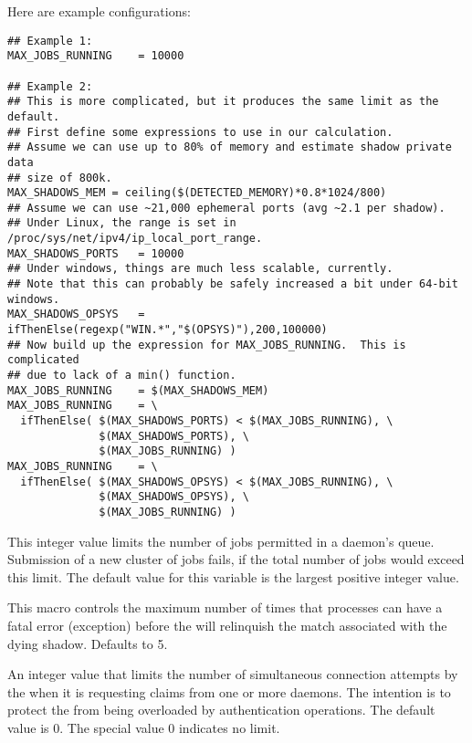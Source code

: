 \begin{description}
  Here are example configurations:

\footnotesize
\begin{verbatim}
## Example 1:
MAX_JOBS_RUNNING	= 10000

## Example 2:
## This is more complicated, but it produces the same limit as the default.
## First define some expressions to use in our calculation.
## Assume we can use up to 80% of memory and estimate shadow private data
## size of 800k.
MAX_SHADOWS_MEM	= ceiling($(DETECTED_MEMORY)*0.8*1024/800)
## Assume we can use ~21,000 ephemeral ports (avg ~2.1 per shadow).
## Under Linux, the range is set in /proc/sys/net/ipv4/ip_local_port_range.
MAX_SHADOWS_PORTS	= 10000
## Under windows, things are much less scalable, currently.
## Note that this can probably be safely increased a bit under 64-bit windows.
MAX_SHADOWS_OPSYS	= ifThenElse(regexp("WIN.*","$(OPSYS)"),200,100000)
## Now build up the expression for MAX_JOBS_RUNNING.  This is complicated
## due to lack of a min() function.
MAX_JOBS_RUNNING	= $(MAX_SHADOWS_MEM)
MAX_JOBS_RUNNING	= \
  ifThenElse( $(MAX_SHADOWS_PORTS) < $(MAX_JOBS_RUNNING), \
              $(MAX_SHADOWS_PORTS), \
              $(MAX_JOBS_RUNNING) )
MAX_JOBS_RUNNING	= \
  ifThenElse( $(MAX_SHADOWS_OPSYS) < $(MAX_JOBS_RUNNING), \
              $(MAX_SHADOWS_OPSYS), \
              $(MAX_JOBS_RUNNING) )
\end{verbatim}
\normalsize

\label{param:MaxJobsSubmitted}
\item[\Macro{MAX\_JOBS\_SUBMITTED}]
  This integer value limits the number of jobs permitted in 
  a  daemon's queue. Submission of a new cluster
  of jobs fails, if the total number of jobs would exceed this limit. 
  The default value for this variable is the largest positive
  integer value.

\label{param:MaxShadowExceptions}
\item[\Macro{MAX\_SHADOW\_EXCEPTIONS}]
  This macro controls the maximum
  number of times that \Condor{shadow} processes can have a fatal
  error (exception) before the  will relinquish
  the match associated with the dying shadow.  Defaults to 5.

\label{param:MaxPendingStartdContacts}
\item[\Macro{MAX\_PENDING\_STARTD\_CONTACTS}]
  An integer value that limits
  the number of simultaneous connection attempts by the 
  when it is requesting claims from one or more  daemons.
  The intention is to protect the  from being overloaded
  by authentication operations.  The default value is 0.
  The special value 0 indicates no limit.


\end{description}
